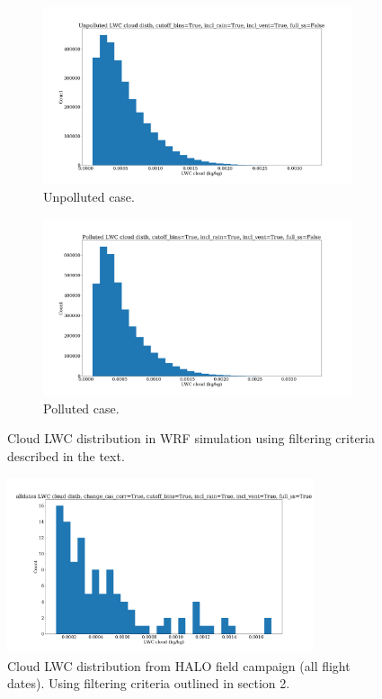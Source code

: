 \documentclass{article}
\begin{document}
\begin{figure}[ht]
	\centering
	\begin{subfigure}{0.7\textwidth}
		\includegraphics[width=\textwidth]{revmywrf/v9_lwc_hist_Unpolluted_figure.png}
		\caption{Unpolluted case.}
		\label{wrflwchistunpoll}
	\end{subfigure}
	\begin{subfigure}{0.7\textwidth}
		\includegraphics[width=\textwidth]{revmywrf/v9_lwc_hist_Polluted_figure.png}
		\caption{Polluted case.}
		\label{wrflwchistpoll}
	\end{subfigure}
	\caption{Cloud LWC distribution in WRF simulation using filtering criteria described in the text.}
	\label{wrflwchist}
\end{figure}
\begin{figure}[ht]
    \centering
    \includegraphics[width=9cm]{revhalo/v24_lwc_hist_cas_alldates_figure.png}
    \caption{Cloud LWC distribution from HALO field campaign (all flight dates). Using filtering criteria outlined in section 2.}
    \label{halolwchist}
\end{figure}
\end{document}

